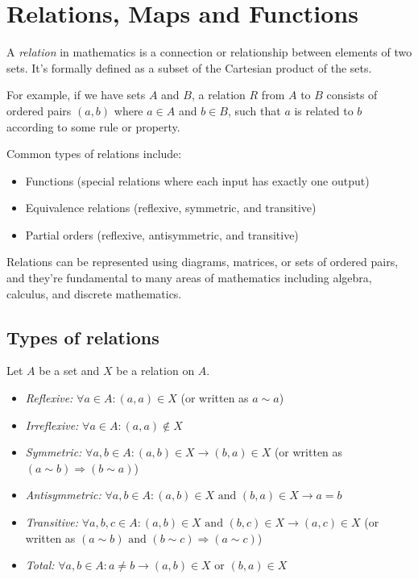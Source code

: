 \newpage
\section{Relations, Maps and Functions}

A \emph{relation} in mathematics is a connection or relationship between elements of two sets. It's formally
defined as a subset of the Cartesian product of the sets.
\vspace{\baselineskip}

For example, if we have sets \(A\) and \(B\), a relation \(R\) from \(A\) to \(B\) consists
of ordered pairs \((a,b)\) where \(a \in A\) and \(b \in B\), such that \(a\) is related to \(b\) according to some rule or property.
\vspace{\baselineskip}

Common types of relations include:
\begin{itemize}
	\item Functions (special relations where each input has exactly one output)
	\item Equivalence relations (reflexive, symmetric, and transitive)
	\item Partial orders (reflexive, antisymmetric, and transitive)
\end{itemize}

Relations can be represented using diagrams, matrices, or sets of
ordered pairs, and they're fundamental to many areas of mathematics including algebra, calculus, and discrete mathematics.

\subsection{Types of relations}

Let \(A\) be a set and \(X\) be a relation on \(A\).

\begin{itemize}
	\item \emph{Reflexive:} \(\forall a \in A: (a, a) \in X\) (or written as \(a \sim a\))

	\item \emph{Irreflexive:} \(\forall a \in A: (a, a) \not\in X\)

	\item \emph{Symmetric:} \(\forall a, b \in A: (a, b) \in X \to (b, a) \in X\) (or written as \((a \sim b) \Rightarrow (b \sim a)\))

	\item \emph{Antisymmetric:} \(\forall a, b \in A: (a, b) \in X \text{ and } (b, a) \in X \to a = b\)

	\item \emph{Transitive:} \(\forall a, b, c \in A: (a, b) \in X \text{ and } (b, c) \in X \to (a, c) \in X\) (or written as \((a \sim b) \text{ and } (b \sim c) \Rightarrow (a \sim c)\))

	\item \emph{Total:} \(\forall a,b \in A: a \neq b \to (a, b) \in X \text{ or } (b, a) \in X\)
\end{itemize}

